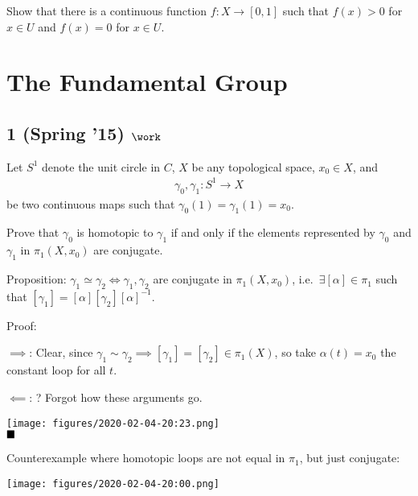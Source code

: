 Show that there is a continuous function \(f : X \to [0,1]\) such that
\(f (x) > 0\) for \(x \in U\) and \(f (x) = 0\) for \(x \in U\).

\hypertarget{the-fundamental-group}{%
\section{The Fundamental Group}\label{the-fundamental-group}}

\hypertarget{spring-15-work}{%
\subsection{\texorpdfstring{1 (Spring '15)
\(\work\)}{1 (Spring '15) \textbackslash work}}\label{spring-15-work}}

Let \(S^1\) denote the unit circle in \(C\), \(X\) be any topological
space, \(x_0 \in X\), and
\begin{align*}\gamma_0, \gamma_1 : S^1 \to X\end{align*}
be two continuous maps such that \(\gamma_0 (1) = \gamma_1 (1) = x_0\).

Prove that \(\gamma_0\) is homotopic to \(\gamma_1\) if and only if the
elements represented by \(\gamma_0\) and \(\gamma_1\) in
\(\pi_1 (X, x_0 )\) are conjugate.


\begin{solution}

\hfill

\begin{concept}

\hfill

\end{concept}

Proposition: \(\gamma_1 \simeq\gamma_2 \iff \gamma_1, \gamma_2\) are
conjugate in \(\pi_1(X, x_0)\), i.e.~\(\exists [\alpha] \in \pi_1\) such
that \([\gamma_1] = [\alpha][\gamma_2][\alpha]^{-1}\).

Proof:

\(\implies\): Clear, since
\(\gamma_1 \sim \gamma_2 \implies [\gamma_1] = [\gamma_2] \in \pi_1(X)\),
so take \(\alpha(t) = x_0\) the constant loop for all \(t\).

\(\impliedby\): ? Forgot how these arguments go.

\texttt{[image: figures/2020-02-04-20:23.png]}\\

\(\hfill\blacksquare\)

Counterexample where homotopic loops are not equal in \(\pi_1\), but
just conjugate:

\texttt{[image: figures/2020-02-04-20:00.png]}\\

\end{solution}

